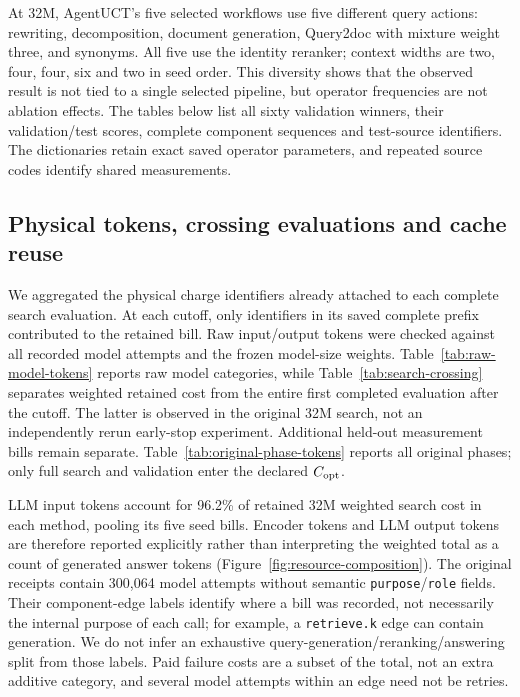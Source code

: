 At 32M, AgentUCT's five selected workflows use five different query actions:
rewriting, decomposition, document generation, Query2doc with mixture weight
three, and synonyms. All five use the identity reranker; context widths are
two, four, four, six and two in seed order. This diversity shows that the
observed result is not tied to a single selected pipeline, but operator
frequencies are not ablation effects. The tables below list all sixty
validation winners, their validation/test scores, complete component sequences
and test-source identifiers. The dictionaries retain exact saved operator
parameters, and repeated source codes identify shared measurements.

\ifdefined\AgentUCTReading\else\clearpage\fi

\ifdefined\AgentUCTReading\else\clearpage\fi

\subsection{Physical tokens, crossing evaluations and cache reuse}
\label{sec:resource-analysis}
We aggregated the physical charge identifiers already attached to each complete
search evaluation. At each cutoff, only identifiers in its saved complete prefix
contributed to the retained bill. Raw input/output tokens were checked against
all recorded model attempts and the frozen model-size weights. Table~\ref{tab:raw-model-tokens}
reports raw model categories, while Table~\ref{tab:search-crossing} separates
weighted retained cost from the entire first completed evaluation after the
cutoff. The latter is observed in the original 32M search, not an independently
rerun early-stop experiment. Additional held-out measurement bills remain
separate. Table~\ref{tab:original-phase-tokens} reports all original phases;
only full search and validation enter the declared $C_{\rm opt}$.

LLM input tokens account for 96.2\% of retained 32M weighted search cost in
each method, pooling its five seed bills. Encoder tokens and LLM output tokens
are therefore reported explicitly rather than interpreting the weighted total
as a count of generated answer tokens (Figure~\ref{fig:resource-composition}).
The original receipts contain 300,064 model attempts without semantic
\texttt{purpose}/\texttt{role} fields. Their component-edge labels identify
where a bill was recorded, not necessarily the internal purpose of each call;
for example, a \texttt{retrieve.k} edge can contain generation. We do not infer
an exhaustive query-generation/reranking/answering split from those labels.
Paid failure costs are a subset of the total, not an extra additive category,
and several model attempts within an edge need not be retries.


